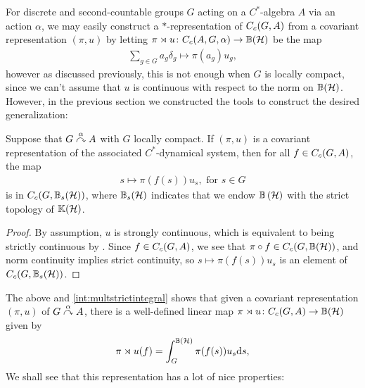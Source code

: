 For discrete and second-countable groups $G$ acting on a $C^*$-algebra $A$ via an action $\alpha$, we may easily construct a $*$-representation of $C_c(G,A)$ from a covariant representation $(\pi,u)$ by letting $\pi \rtimes u \colon C_c(A,G,\alpha) \to \mathbb{B}(\mathcal{H})$ be the map
\begin{align*}
\sum_{g \in G} a_g \delta_g \mapsto \pi(a_g) u_g,
\end{align*}
however as discussed previously, this is not enough when $G$ is locally compact, since we can't assume that $u$ is continuous with respect to the norm on $\mathbb{B}(\mathcal{H})$. However, in the previous section we constructed the tools to construct the desired generalization:
\begin{lemma}
Suppose that $G \stackrel{\alpha}{\curvearrowright} A$ with $G$ locally compact. If $(\pi,u)$ is a covariant representation of the associated $C^*$-dynamical system, then for all $f \in C_c(G,A)$, the map
\begin{align*}
	s \mapsto \pi(f(s)) u_s, \text{ for }s \in G
\end{align*}
is in $C_c(G,\mathbb{B}_s(\mathcal{H}))$, where $\mathbb{B}_s(\mathcal{H})$ indicates that we endow $\mathbb{B}\left(\mathcal{H} \right)$ with the strict topology of $ \mathbb{K}(\mathcal{H})$.
\label{cross:integrandcont}
\end{lemma}
\begin{proof}
By assumption, $u$ is strongly continuous, which is equivalent to being strictly continuous by . Since $f \in C_c(G,A)$, we see that $\pi \circ f \in C_c(G,\mathbb{B}(\mathcal{H}))$, and norm continuity implies strict continuity, so $s \mapsto \pi(f(s)) u_s$ is an element of $C_c(G,\mathbb{B}_s(\mathcal{H}))$.
\end{proof}
The above and \ref{int:multstrictintegral} shows that given a covariant representation $(\pi,u)$ of $G \stackrel{\alpha}{\curvearrowright} A$, there is a well-defined linear map $\pi \rtimes u \colon C_c(G,A) \to \mathbb{B}(\mathcal{H})$ given by
\begin{align*}
\pi \rtimes u (f) = \int_G^{\mathbb{B}(\mathcal{H})} \pi(f(s)) u_s \mathrm{d} s,
\end{align*}
We shall see that this representation has a lot of nice properties:


